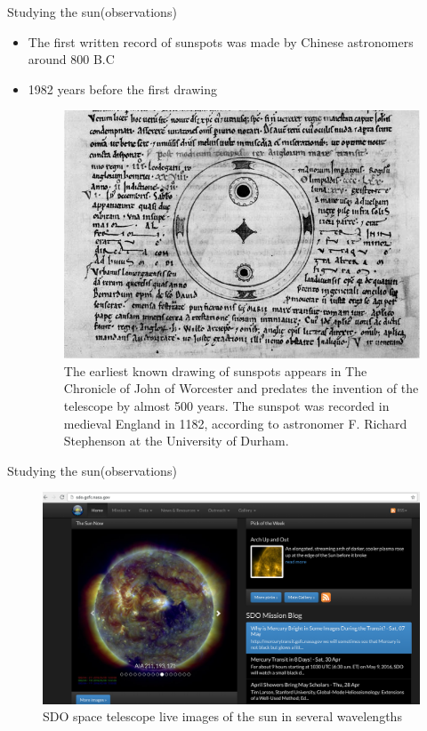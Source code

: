 \documentclass{beamer}
\begin{document}
\usebackgroundtemplate{ }  

\begin{frame}{Studying the sun(observations)}
\begin{itemize}
\item The first written record of sunspots was made by Chinese astronomers around 800 B.C
\item 1982 years before the first drawing

\begin{figure}[H]
 \centering
 \includegraphics[scale=0.5]{jwex.jpg}
  \caption{The earliest known drawing of sunspots appears in The Chronicle of John of Worcester 
	and predates the invention of the telescope by almost 500 years. 
	The sunspot was recorded in medieval England in 1182, according to astronomer 
	F. Richard Stephenson at the University of Durham. }
\end{figure}


\end{itemize}

\end{frame}

\begin{frame}{Studying the sun(observations)}
\begin{figure}[H]
 \centering
 \includegraphics[scale=0.25]{sdo.png}
  \caption{SDO space telescope live images of the sun in several wavelengths}
\end{figure}
\end{frame}
\end{document}
